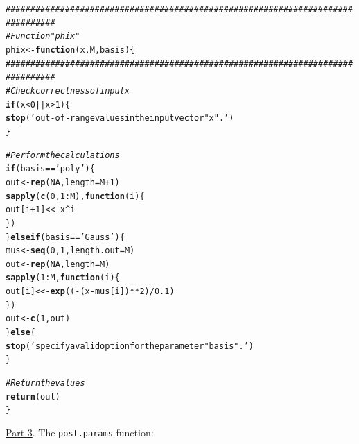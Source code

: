 \documentclass[a4paper, 11pt]{article}\usepackage[]{graphicx}\usepackage[]{color}
\makeatletter
\newcommand{\hlnum}[1]{\textcolor[rgb]{0.686,0.059,0.569}{#1}}%
\newcommand{\hlstr}[1]{\textcolor[rgb]{0.192,0.494,0.8}{#1}}%
\newcommand{\hlcom}[1]{\textcolor[rgb]{0.678,0.584,0.686}{\textit{#1}}}%
\newcommand{\hlopt}[1]{\textcolor[rgb]{0,0,0}{#1}}%
\newcommand{\hlstd}[1]{\textcolor[rgb]{0.345,0.345,0.345}{#1}}%
\newcommand{\hlkwa}[1]{\textcolor[rgb]{0.161,0.373,0.58}{\textbf{#1}}}%
\newcommand{\hlkwb}[1]{\textcolor[rgb]{0.69,0.353,0.396}{#1}}%
\newcommand{\hlkwc}[1]{\textcolor[rgb]{0.333,0.667,0.333}{#1}}%
\newcommand{\hlkwd}[1]{\textcolor[rgb]{0.737,0.353,0.396}{\textbf{#1}}}%
\newenvironment{kframe}{%
 \def\at@end@of@kframe{}%
 \ifinner\ifhmode%
  \def\at@end@of@kframe{\end{minipage}}%
  \begin{minipage}{\columnwidth}%
 \fi\fi%
 \def\FrameCommand##1{\hskip\@totalleftmargin \hskip-\fboxsep
 \colorbox{shadecolor}{##1}\hskip-\fboxsep
     \hskip-\linewidth \hskip-\@totalleftmargin \hskip\columnwidth}%
 \MakeFramed {\advance\hsize-\width
   \@totalleftmargin\z@ \linewidth\hsize
   \@setminipage}}%
 {\par\unskip\endMakeFramed%
 \at@end@of@kframe}
\newenvironment{knitrout}{}{} %
\makeatother
\begin{document}
\begin{knitrout}\small
{}\color{fgcolor}\begin{kframe}
\begin{alltt}
\hlcom{################################################################################}
\hlcom{# Function "phix"}
\hlstd{phix} \hlkwb{<-} \hlkwa{function}\hlstd{(}\hlkwc{x}\hlstd{,} \hlkwc{M}\hlstd{,} \hlkwc{basis}\hlstd{) \{}
\hlcom{################################################################################}
  \hlcom{# Check correctness of input x}
  \hlkwa{if} \hlstd{(x} \hlopt{<} \hlnum{0} \hlopt{||} \hlstd{x} \hlopt{>} \hlnum{1}\hlstd{) \{}
    \hlkwd{stop}\hlstd{(}\hlstr{'out-of-range values in the input vector "x".'}\hlstd{)}
  \hlstd{\}}

  \hlcom{# Perform the calculations  }
  \hlkwa{if} \hlstd{(basis} \hlopt{==} \hlstr{'poly'}\hlstd{) \{}
    \hlstd{out} \hlkwb{<-} \hlkwd{rep}\hlstd{(}\hlnum{NA}\hlstd{,} \hlkwc{length} \hlstd{= M} \hlopt{+} \hlnum{1}\hlstd{)}
    \hlkwd{sapply}\hlstd{(}\hlkwd{c}\hlstd{(}\hlnum{0}\hlstd{,} \hlnum{1}\hlopt{:}\hlstd{M),} \hlkwa{function}\hlstd{(}\hlkwc{i}\hlstd{) \{}
      \hlstd{out[i} \hlopt{+} \hlnum{1}\hlstd{]} \hlkwb{<<-} \hlstd{x}\hlopt{^}\hlstd{i}
    \hlstd{\})}
  \hlstd{\}} \hlkwa{else if} \hlstd{(basis} \hlopt{==} \hlstr{'Gauss'}\hlstd{) \{}
    \hlstd{mus} \hlkwb{<-} \hlkwd{seq}\hlstd{(}\hlnum{0}\hlstd{,} \hlnum{1}\hlstd{,} \hlkwc{length.out} \hlstd{= M)}
    \hlstd{out} \hlkwb{<-} \hlkwd{rep}\hlstd{(}\hlnum{NA}\hlstd{,} \hlkwc{length} \hlstd{= M)}
    \hlkwd{sapply}\hlstd{(}\hlnum{1}\hlopt{:}\hlstd{M,} \hlkwa{function}\hlstd{(}\hlkwc{i}\hlstd{) \{}
      \hlstd{out[i]} \hlkwb{<<-} \hlkwd{exp}\hlstd{((}\hlopt{-}\hlstd{(x} \hlopt{-} \hlstd{mus[i])} \hlopt{**} \hlnum{2}\hlstd{)} \hlopt{/} \hlnum{0.1}\hlstd{)}
    \hlstd{\})}
    \hlstd{out} \hlkwb{<-} \hlkwd{c}\hlstd{(}\hlnum{1}\hlstd{, out)}
  \hlstd{\}} \hlkwa{else} \hlstd{\{}
    \hlkwd{stop}\hlstd{(}\hlstr{'specify a valid option for the parameter "basis".'}\hlstd{)}
  \hlstd{\}}

  \hlcom{# Return the values}
  \hlkwd{return}\hlstd{(out)}
\hlstd{\}}
\end{alltt}
\end{kframe}
\end{knitrout}
\underline{Part 3}. The \texttt{post.params} function:
\end{document}
